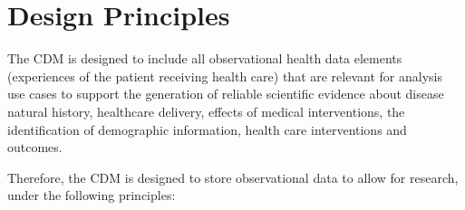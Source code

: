\documentclass[11pt]{book}
\theoremstyle{definition}
\theoremstyle{definition}
\theoremstyle{definition}
\theoremstyle{remark}
\begin{document}
\hypertarget{design-principles}{%
\section{Design Principles}\label{design-principles}}

The CDM is designed to include all observational health data elements (experiences of the patient receiving health care) that are relevant for analysis use cases to support the generation of reliable scientific evidence about disease natural history, healthcare delivery, effects of medical interventions, the identification of demographic information, health care interventions and outcomes.

Therefore, the CDM is designed to store observational data to allow for research, under the following principles:
\end{document}
